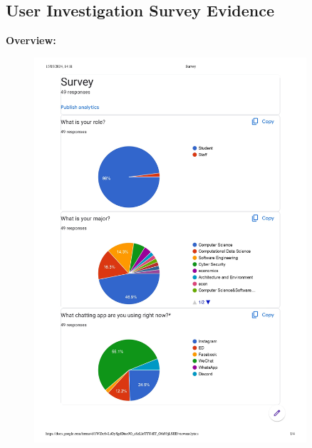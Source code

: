 \documentclass[12pt]{article}
\begin{document}
    \subsection{User Investigation Survey Evidence}
    \label{survey}
        \textbf{Overview:}

        \begin{figure}[H]
            \centering
            \includegraphics[width=0.9\textwidth]{graphs/Survey-summary_page-0001.jpg}
        \end{figure}
\end{document}
